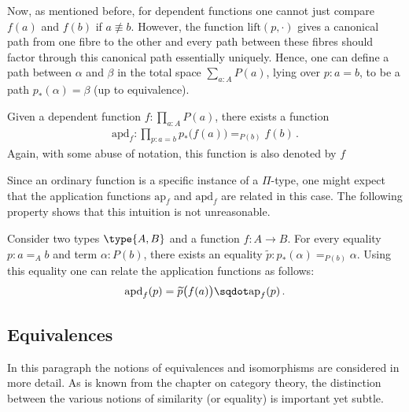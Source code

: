     Now, as mentioned before, for dependent functions one cannot just compare $f(a)$ and $f(b)$ if $a\not\equiv b$. However, the function $\mathrm{lift}(p,\cdot)$ gives a canonical path from one fibre to the other and every path between these fibres should factor through this canonical path essentially uniquely. Hence, one can define a path between $\alpha$ and $\beta$ in the total space $\sum_{a:A}P(a)$, lying over $p:a=b$, to be a path $p_*(\alpha)=\beta$ (up to equivalence).
    \begin{property}
        Given a dependent function $f:\prod_{a:A}P(a)$, there exists a function
        \begin{gather}
            \mathrm{apd}_f:\prod_{p:a=b}p_*\big(f(a)\big)=_{P(b)}f(b)\,.
        \end{gather}
        Again, with some abuse of notation, this function is also denoted by $f$
    \end{property}

    Since an ordinary function is a specific instance of a $\Pi$-type, one might expect that the application functions $\mathrm{ap}_f$ and $\mathrm{apd}_f$ are related in this case. The following property shows that this intuition is not unreasonable.
    \begin{property}
        Consider two types $\type{A,B}$ and a function $f:A\rightarrow B$. For every equality $p:a=_Ab$ and term $\alpha:P(b)$, there exists an equality $\widetilde{p}:p_*(\alpha)=_{P(b)}\alpha$. Using this equality one can relate the application functions as follows:
        \begin{gather}
            \mathrm{apd}_f(p) = \widetilde{p}\big(f(a)\big)\sqdot\mathrm{ap}_f(p)\,.
        \end{gather}
    \end{property}

\subsection{Equivalences}

    In this paragraph the notions of equivalences and isomorphisms are considered in more detail. As is known from the chapter on category theory, the distinction between the various notions of similarity (or equality) is important yet subtle.

